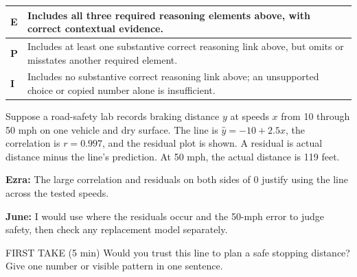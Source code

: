 \documentclass[11pt]{article}
\begin{document}
{\small\renewcommand{\arraystretch}{1.25}
\noindent\begin{tabular}{|p{0.5in}|p{5.9in}|}
\hline
\textbf{E} & Includes all three required reasoning elements above, with correct contextual evidence. \\ \hline
\textbf{P} & Includes at least one substantive correct reasoning link above, but omits or misstates another required element. \\ \hline
\textbf{I} & Includes no substantive correct reasoning link above; an unsupported choice or copied number alone is insufficient. \\ \hline
\end{tabular}}

\clearpage
{}

Suppose a road-safety lab records braking distance $y$ at speeds $x$ from 10 through 50 mph on one vehicle and dry surface. The line is $\hat y=-10+2.5x$, the correlation is $r=0.997$, and the residual plot is shown. A residual is actual distance minus the line's prediction. At 50 mph, the actual distance is 119 feet.\par\smallskip \textbf{Ezra:} The large correlation and residuals on both sides of 0 justify using the line across the tested speeds.\par \textbf{June:} I would use where the residuals occur and the 50-mph error to judge safety, then check any replacement model separately.\par
\begin{center}
\end{center}
\begin{firsttakebox}{FIRST TAKE (5 min)}
Would you trust this line to plan a safe stopping distance? Give one number or visible pattern in one sentence.\par
{}
\end{firsttakebox}
\end{document}
